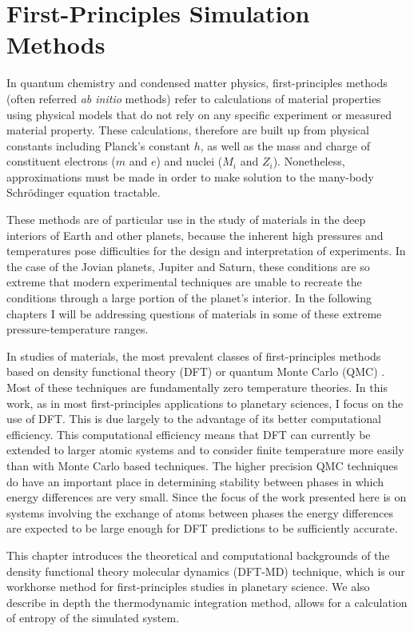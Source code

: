\chapter{First-Principles Simulation Methods}\label{chap2}


In quantum chemistry and condensed matter physics, first-principles methods (often
referred \textit{ab initio} methods) refer to calculations of material properties
using physical models that do not rely on any specific experiment or measured
material property. These calculations, therefore are built up from physical constants
including Planck's constant $h$, as well as the mass  and charge of constituent
electrons ($m$ and $e$) and nuclei ($M_i$ and $Z_i$). Nonetheless, approximations
must be made in order to make solution to the many-body Schr\"odinger equation
tractable.

These methods are of particular use in the study of materials in the deep interiors
of Earth and other planets, because the inherent high pressures and temperatures
pose difficulties for the design and interpretation of experiments. In the case of the
Jovian planets, Jupiter and Saturn, these conditions are so extreme that modern
experimental techniques are unable to recreate the conditions through a large portion
of the planet's interior. In the following chapters I will be addressing questions of
materials in some of these extreme pressure-temperature ranges.

In studies of materials, the most prevalent classes of first-principles methods based
on density functional theory (DFT) or quantum Monte Carlo (QMC)
\citep{Allen1987,Newman1999,martin-esbook}. Most of these
techniques are fundamentally zero temperature theories. In this work, as in most
first-principles applications to planetary sciences, I focus on the use of DFT. This
is due largely to the advantage of its better computational efficiency. This
computational efficiency means that DFT can currently be extended to larger atomic
systems and to consider finite temperature more easily than with Monte Carlo based
techniques. The higher precision QMC techniques do have an important place in
determining stability between phases in which energy differences are very small.
Since the focus of the work presented here is on systems involving the exchange of
atoms between phases the energy differences are expected to be large enough for DFT
predictions to be sufficiently accurate.

This chapter introduces the theoretical and computational backgrounds of the density
functional theory molecular dynamics (DFT-MD) technique, which is our workhorse
method for first-principles studies in planetary science. We also describe in depth
the thermodynamic integration method, allows for a calculation of entropy of the
simulated system.


